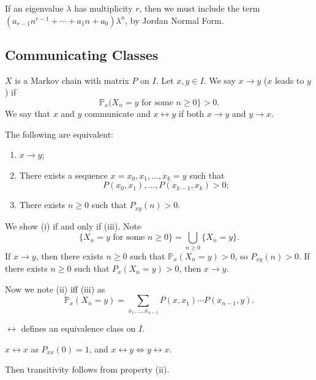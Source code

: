 \documentclass[12pt]{article}
\begin{document}
If an eigenvalue $\lambda$ has multiplicity $r$, then we must include the term $(a_{r-1}n^{r-1} + \cdots + a_1 n + a_0) \lambda^{n}$, by Jordan Normal Form.

\subsection{Communicating Classes}%
\label{sub:communicating_classes}

\begin{definition}
	$X$ is a Markov chain with matrix $P$ on $I$. Let $x, y \in I$. We say $x \to y$ ($x$ leads to $y$) if
	\[
	\mathbb{P}_x(X_n = y \text{ for some } n \geq 0\} > 0
	.\]
	We say that $x$ and $y$ communicate and $x \leftrightarrow y$ if both $x \to y$ and $y \to x$.
\end{definition}

\begin{theorem}
	The following are equivalent:
	\begin{enumerate}[\normalfont(i)]
		\item $x \to y$;
		\item There exists a sequence $x = x_0, x_1, \ldots, x_k = y$ such that 
			\[P(x_0, x_1), \ldots, P(x_{k-1}, x_k) > 0;\]
		\item There exists $n \geq 0$ such that $P_{xy}(n) > 0$.
	\end{enumerate}	
\end{theorem}

\begin{proofbox}
We show (i) if and only if (iii). Note
\[
	\{X_n = y \text{ for some } n \geq 0 \} = \bigcup_{n \geq 0} \{X_n = y\}
.\]
If $x \to y$, then there exists $n \geq 0$ such that $\mathbb{P}_x(X_n = y) > 0$, so $P_{xy}(n) > 0$. If there exists $n \geq 0$ such that $P_x(X_n = y) > 0$, then $x \to y$.

Now we note (ii) iff (iii) as
\[
	\mathbb{P}_x(X_n = y) = \sum_{x_1, \ldots, x_{n-1}} P(x, x_1) \cdots P(x_{n-1}, y)
.\]
\end{proofbox}

\begin{corollary}
	$\leftrightarrow$ defines an equivalence class on $I$.
\end{corollary}

\begin{proofbox}
	$x \leftrightarrow x$ as $P_{xx}(0) = 1$, and $x \leftrightarrow y \iff y \leftrightarrow x$.

	Then transitivity follows from property (ii).
\end{proofbox}
\end{document}
